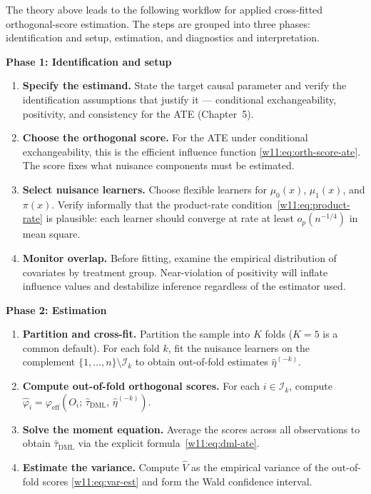 \documentclass[master.tex]{subfiles}
\begin{document}
The theory above leads to the following workflow for applied
cross-fitted orthogonal-score estimation.  The steps are grouped
into three phases: identification and setup, estimation, and
diagnostics and interpretation.

\begin{tcolorbox}[defstyle, title={Workflow: Cross-Fitted Causal Estimation}]
\textbf{Phase 1: Identification and setup}
\begin{enumerate}
  \item \textbf{Specify the estimand.}  State the target causal
    parameter and verify the identification assumptions that justify
    it — conditional exchangeability, positivity, and consistency
    for the ATE (Chapter~5).
  \item \textbf{Choose the orthogonal score.}  For the ATE under
    conditional exchangeability, this is the efficient influence
    function \eqref{w11:eq:orth-score-ate}.  The score fixes what
    nuisance components must be estimated.
  \item \textbf{Select nuisance learners.}  Choose flexible learners
    for $\mu_0(x)$, $\mu_1(x)$, and $\pi(x)$.  Verify informally
    that the product-rate condition~\eqref{w11:eq:product-rate} is
    plausible: each learner should converge at rate at least
    $o_p(n^{-1/4})$ in mean square.
  \item \textbf{Monitor overlap.}  Before fitting, examine the
    empirical distribution of covariates by treatment group.
    Near-violation of positivity will inflate influence values and
    destabilize inference regardless of the estimator used.
\end{enumerate}

\medskip
\textbf{Phase 2: Estimation}
\begin{enumerate}[resume]
  \item \textbf{Partition and cross-fit.}  Partition the sample into
    $K$ folds ($K = 5$ is a common default).  For each fold $k$,
    fit the nuisance learners on the complement
    $\{1,\ldots,n\}\setminus\mathcal{I}_k$ to obtain out-of-fold
    estimates $\hat\eta^{(-k)}$.
  \item \textbf{Compute out-of-fold orthogonal scores.}  For each
    $i \in \mathcal{I}_k$, compute
    $\hat\varphi_i =
    \varphi_{\mathrm{eff}}(O_i;\,\hat\tau_{\mathrm{DML}},\,
    \hat\eta^{(-k)})$.
  \item \textbf{Solve the moment equation.}  Average the scores
    across all observations to obtain $\hat\tau_{\mathrm{DML}}$
    via the explicit formula~\eqref{w11:eq:dml-ate}.
  \item \textbf{Estimate the variance.}  Compute $\hat{V}$ as the
    empirical variance of the out-of-fold scores
    \eqref{w11:eq:var-est} and form the Wald confidence interval.
\end{enumerate}


\end{tcolorbox}
\end{document}
